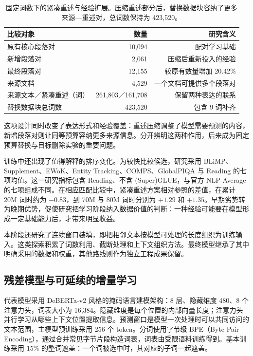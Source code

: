 \begin{table}[htbp]
\caption{固定词数下的紧凑重述与经验扩展。压缩重述部分后，替换数据块容纳了更多来源—重述对，总词数保持为 423,520。}
\label{tab:compact}
\begin{tabularx}{\linewidth}{@{}Yrr@{}}
\toprule 比较对象 & 数量 & 研究含义\\\midrule
原有核心段落对 & 10,094 & 配对学习基础\\
新增段落对 & 2,061 & 压缩后重新投入的经验\\
最终段落对 & 12,155 & 较原有数量增加 20.42\%\\
来源文档 & 4,529 & 一个文档可提供多个段落对\\
来源文本／紧凑重述（词） & 261,803／161,708 & 保留两种表达的联系\\
替换数据块总词数 & 423,520 & 包含 9 词补齐\\
\bottomrule
\end{tabularx}
\end{table}

这项设计同时改变了表达形式和经验覆盖：重述压缩调整了模型需要预测的内容，新增段落对则让同等预算容纳更多来源信息。分开辨明这两种作用，后来成为固定预算替换与目标删除实验的重要问题。

训练中还出现了值得解释的排序变化。为较快比较候选，研究采用 BLiMP、Supplement、EWoK、Entity Tracking、COMPS、GlobalPIQA 与 Reading 的七项均值。这一研究指标包含 Reading、不含 (Super)GLUE，与官方 NLP Average 的七项组成不同。在相应匹配比较中，紧凑重述方案相对参照的差值，在累计 20M 词时约为 $-0.83$，到 70M 与 80M 词时分别为 $+1.29$ 和 $+1.35$。早期劣势转为晚期优势，促使研究把学习阶段纳入数据价值的判断：一种经验可能要在模型形成一定基础能力后，才带来明显收益。

本阶段还研究了连续窗口装填，即把相邻文本按模型可处理的长度组织为训练输入。这类探索积累了词数利用、截断处理和上下文组织方法。最终模型继承了其中明确采用的数据和权重，其他路线则作为独立工程成果保留。

\subsection{残差模型与可延续的增量学习}

代表模型采用 DeBERTa-v2 风格的掩码语言建模架构\citep{he2021deberta,microsoft2021debertav2}：8 层、隐藏维度 480、8 个注意力头，词表大小为 16,384。隐藏维度是每个位置的内部向量长度；注意力头并行学习从哪些上下文位置提取信息。预测窗口是模型一次处理时可以共同访问的文本范围，主模型预训练采用 256 个 token。分词使用字节级 BPE（Byte Pair Encoding），通过合并常见字节片段构造词表，词表由受限语料训练得到。基本训练采用 15\% 的整词遮盖：一个词被选中时，其对应的子词一起遮盖。

